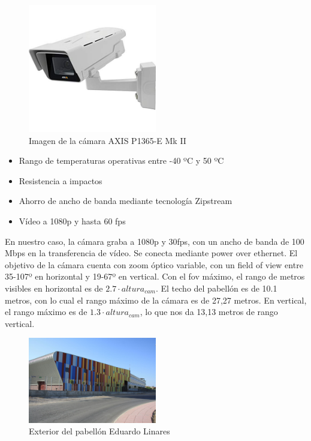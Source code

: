 \begin{figure}
    \centering
    \includegraphics[width=0.5\textwidth]{images/camara}
    \caption{Imagen de la cámara AXIS P1365-E Mk II}
    \label{fig:camara}
\end{figure}

\begin{itemize}
    \item Rango de temperaturas operativas entre -40 ºC y 50 ºC
    \item Resistencia a impactos
    \item Ahorro de ancho de banda mediante tecnología Zipstream
    \item Vídeo a 1080p y hasta 60 fps
\end{itemize}

En nuestro caso, la cámara graba a 1080p y 30fps, con un ancho de banda de 100 Mbps en la transferencia de vídeo. Se conecta mediante power over ethernet. El objetivo de la cámara cuenta con zoom óptico variable, con un field of view entre 35-107º en horizontal y 19-67º en vertical. Con el fov máximo, el rango de metros visibles en horizontal es de $2.7\cdot altura_{cam}$. El techo del pabellón es de 10.1 metros, con lo cual el rango máximo de la cámara es de 27,27 metros. En vertical, el rango máximo es de $1.3 \cdot altura_{cam}$, lo que nos da 13,13 metros de rango vertical.

\begin{figure}
    \centering
    \includegraphics[width=0.5\textwidth]{images/EduardoLinares}
    \caption{Exterior del pabellón Eduardo Linares}
    \label{fig:pabellon}
\end{figure}

